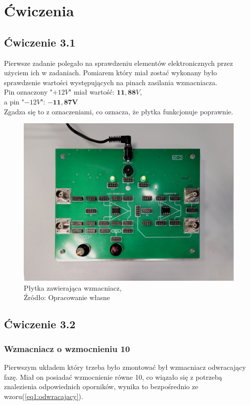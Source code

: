 \documentclass{article}
\begin{document}
  \section{Ćwiczenia}
    \subsection{Ćwiczenie 3.1}
      Pierwsze zadanie polegało na sprawdzeniu elementów elektronicznych przez użyciem ich w zadaniach. Pomiarem który miał zostać wykonany było sprawdzenie wartości występujących na pinach zasilania wzmacniacza. \\
      Pin oznaczony "$+12V$"\mbox{} miał wartość: $\mathbf{11,88}V$, \\
      a pin "$-12V$": $\mathbf{-11,87V}$ \\
      Zgadza się to z oznaczeniami, co oznacza, że płytka funkcjonuje poprawnie.

      \begin{figure}[!ht]
        \centering
        \includegraphics[scale=0.06]{grafiki/plytka.jpg}
        \caption{Płytka zawierająca wzmacniacz,
        \\Źródło: Opracowanie własne}
      \end{figure}

      \pagebreak
    
    \subsection{Ćwiczenie 3.2}
      \subsubsection{Wzmacniacz o wzmocnieniu 10}
        Pierwszym układem który trzeba było zmontować był wzmacniacz odwracający fazę. Miał on posiadać wzmocnienie równe 10, co wiązało się z potrzebą znalezienia odpowiednich oporników, wynika to bezpośrednio ze wzoru(\ref{eq1:odwracajacy}).
\end{document}
